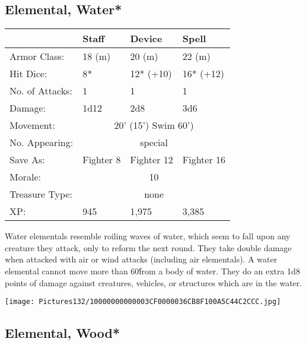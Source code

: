 \documentclass[a4paper,twoside,openany,10pt]{book}
\begin{document}
\begin{multicols}{2}
\subsection*{Elemental, Water*}\label{elemental-water}

\begin{tabularx}{0.48\textwidth}{@{}lllX@{}}
& Staff & Device & Spell \\\hline
Armor Class: & 18 (m) & 20 (m) & 22 (m) \\\hline
Hit Dice: & 8* & 12* (+10) & 16* (+12) \\\hline
No. of Attacks: & 1 & 1 & 1 \\\hline
Damage: & 1d12 & 2d8 & 3d6 \\\hline
Movement:  & \multicolumn{3}{c}{20' (15') Swim 60')}\\\hline
No. Appearing: &\multicolumn{3}{c}{special} \\\hline
Save As: & Fighter 8 & Fighter 12 & Fighter 16 \\\hline
Morale: & \multicolumn{3}{c}{10} \\\hline
Treasure Type: & \multicolumn{3}{c}{none} \\\hline
XP: & 945 & 1,975 & 3,385 \\\hline
\end{tabularx}\medskip

Water elementals resemble roiling waves of water, which seem to fall upon any creature they attack, only to reform the next round. They take double damage when attacked with air or wind attacks (including air elementals). A water elemental cannot move more than 60\' from a body of water. They do an extra 1d8 points of damage against creatures, vehicles, or structures which are in the water.


\begin{center}
	\texttt{[image: Pictures132/10000000000003CF0000036CB8F100A5C44C2CCC.jpg]}
\end{center}

\columnbreak

\subsection*{Elemental, Wood*}\label{elemental-wood}


\end{multicols}
\end{document}
